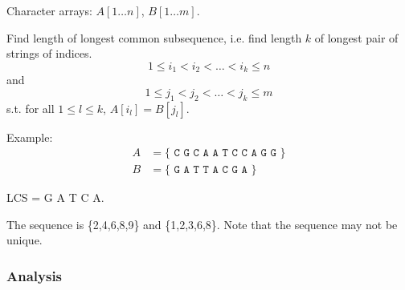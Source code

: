 \AlgoInput Character arrays: $A[1\ldots n]$, $B[1\ldots m]$.

\AlgoOutput Find length of longest common subsequence, i.e.
find length $k$ of longest pair of strings of indices.
\[1\leq i_1 < i_2 < \ldots < i_k \leq n\]
and
\[1 \leq j_1 < j_2 < \ldots < j_k \leq m\]
s.t. for all $1 \leq l \leq k$, $A[i_l] = B[j_l]$.

Example:
\begin{align*}
    A &= \{\texttt{ C G C A A T C C A G G }\} \\
    B &= \{\texttt{ G A T T A C G A }\}
\end{align*}

LCS = G A T C A.

The sequence is \{2,4,6,8,9\} and \{1,2,3,6,8\}. Note that the sequence may not be unique.

\subsubsection{Analysis}

